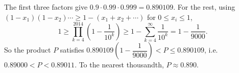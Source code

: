 The first three factors give $0.9\cdot0.99\cdot0.999=0.890109$. For the rest, using $(1-x_1)(1-x_2)\cdots\ge1-(x_1+x_2+\cdots)$ for $0\le x_i\le1$,
\[
1\ge\prod_{k=4}^{2014}\left(1-\dfrac{1}{10^k}\right)\ge1-\sum_{k=4}^{\infty}\dfrac{1}{10^k}=1-\dfrac{1}{9000}.
\]
So the product $P$ satisfies $0.890109\left(1-\dfrac{1}{9000}\right)<P\le0.890109$, i.e. $0.89000<P<0.89011$. To the nearest thousandth, $P\approx\boxed{0.890}$.
